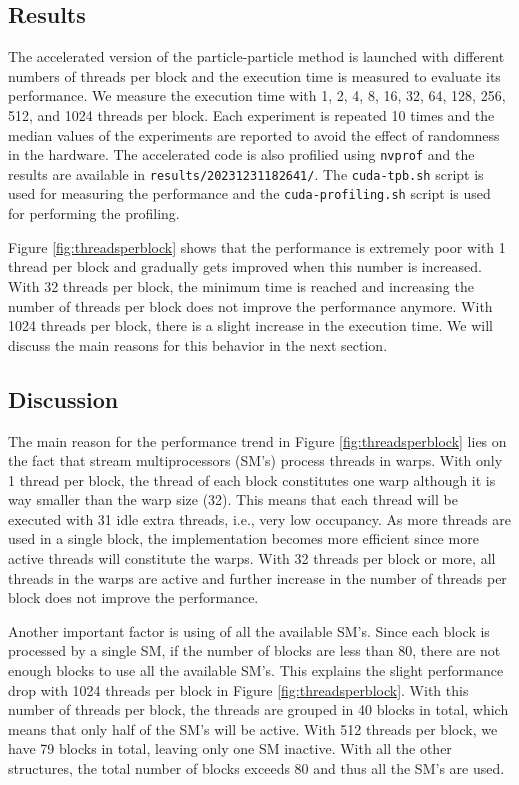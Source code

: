 \documentclass[10pt,journal,compsocconf]{IEEEtran}
\newcommand{\code}[1]{{\small \texttt{#1}}}
\begin{document}
\subsection{Results}

The accelerated version of the particle-particle method is launched with different numbers of threads per block and the execution time is measured to evaluate its performance. We measure the execution time with 1, 2, 4, 8, 16, 32, 64, 128, 256, 512, and 1024 threads per block. Each experiment is repeated 10 times and the median values of the experiments are reported to avoid the effect of randomness in the hardware. The accelerated code is also profilied using \code{nvprof} and the results are available in \code{results/20231231182641/}. The \code{cuda-tpb.sh} script is used for measuring the performance and the \code{cuda-profiling.sh} script is used for performing the profiling.

Figure \ref{fig:threadsperblock} shows that the performance is extremely poor with 1 thread per block and gradually gets improved when this number is increased. With 32 threads per block, the minimum time is reached and increasing the number of threads per block does not improve the performance anymore. With 1024 threads per block, there is a slight increase in the execution time. We will discuss the main reasons for this behavior in the next section.

\subsection{Discussion}

The main reason for the performance trend in Figure \ref{fig:threadsperblock} lies on the fact that stream multiprocessors (SM's) process threads in warps. With only 1 thread per block, the thread of each block constitutes one warp although it is way smaller than the warp size (32). This means that each thread will be executed with 31 idle extra threads, i.e., very low occupancy. As more threads are used in a single block, the implementation becomes more efficient since more active threads will constitute the warps. With 32 threads per block or more, all threads in the warps are active and further increase in the number of threads per block does not improve the performance.

Another important factor is using of all the available SM's. Since each block is processed by a single SM, if the number of blocks are less than 80, there are not enough blocks to use all the available SM's. This explains the slight performance drop with 1024 threads per block in Figure \ref{fig:threadsperblock}. With this number of threads per block, the threads are grouped in 40 blocks in total, which means that only half of the SM's will be active. With 512 threads per block, we have 79 blocks in total, leaving only one SM inactive. With all the other structures, the total number of blocks exceeds 80 and thus all the SM's are used.
\end{document}
